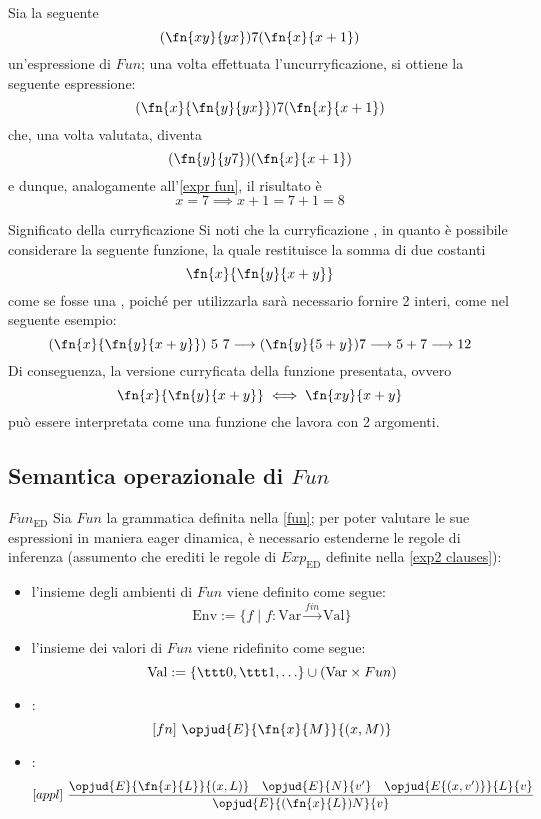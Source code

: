 \documentclass[a4paper, 12pt]{report}
\begin{document}
    \begin{example}[Curryficazioni]
        Sia la seguente $$(\fn{xy}{yx})7(\fn{x}{x+1})$$ un'espressione di $Fun$; una volta effettuata l'uncurryficazione, si ottiene la seguente espressione: $$(\fn{x}{\fn{y}{yx}})7(\fn{x}{x+1})$$ che, una volta valutata, diventa $$(\fn{y}{y7})(\fn{x}{x+1})$$ e dunque, analogamente all'\cref{expr fun}, il risultato è $$x= 7 \implies x+1 = 7 + 1= 8$$
    \end{example}

    \begin{framedobs}{Significato della curryficazione}
        Si noti che la curryficazione , in quanto è possibile considerare la seguente funzione, la quale restituisce la somma di due costanti $$\fn{x}{\fn{y}{x + y}}$$ come se fosse una , poiché per utilizzarla sarà necessario fornire 2 interi, come nel seguente esempio: $$(\fn{x}{\fn{y}{x + y}}) \ 5 \ 7 \longrightarrow (\fn{y}{5 + y})7 \longrightarrow 5 + 7 \longrightarrow 12$$ Di conseguenza, la versione curryficata della funzione presentata, ovvero $$\fn{x}{\fn{y}{x + y}} \iff \fn{xy}{x + y}$$ può essere interpretata come una funzione che lavora con 2 argomenti.
    \end{framedobs}

    \subsection{Semantica operazionale di $Fun$}

    \begin{framedprop}{$Fun_\mathrm{ED}$}
        Sia $Fun$ la grammatica definita nella \cref{fun}; per poter valutare le sue espressioni in maniera eager dinamica, è necessario estenderne le regole di inferenza (assumento che erediti le regole di $Exp_\mathrm{ED}$ definite nella \cref{exp2 clauses}):

        \begin{itemize}
            \item l'insieme degli ambienti di $Fun$ viene definito come segue: $$\mathrm{Env} := \{f \mid f : \mathrm{Var} \xrightarrow{fin} \mathrm{Val}\}$$
            \item l'insieme dei valori di $Fun$ viene ridefinito come segue: $$\mathrm{Val} := \{ \ttt 0, \ttt 1 , \ldots \} \cup (\mathrm{Var} \times Fun)$$                   \item {}: $$[fn] \ \opjud{E}{\fn{x}{M}}{(x,M)}$$
            \item {}: $$[appl] \ \dfrac{\opjud{E}{\fn{x}{L}}{(x,L)} \quad \opjud{E}{N}{v'} \quad \opjud{E\{(x,v')\}}{L}{v}}{\opjud{E}{(\fn{x}{L})N}{v}}$$
        \end{itemize}
    \end{framedprop}
\end{document}
